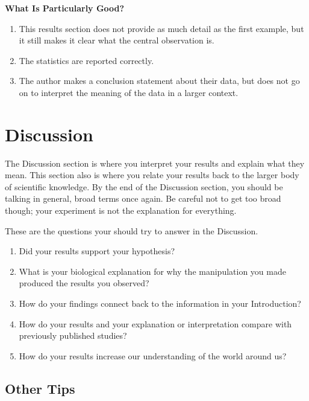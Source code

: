 \documentclass[
]{book}
\providecommand{\tightlist}{%
  \setlength{\itemsep}{0pt}\setlength{\parskip}{0pt}}
\begin{document}
\textbf{What Is Particularly Good?}

\begin{enumerate}
\def\labelenumi{\arabic{enumi}.}
\tightlist
\item
  This results section does not provide as much detail as the first example, but it still makes it clear what the central observation is.
\item
  The statistics are reported correctly.
\item
  The author makes a conclusion statement about their data, but does not go on to interpret the meaning of the data in a larger context.
\end{enumerate}

\hypertarget{discussion380}{%
\chapter{Discussion}\label{discussion380}}

The Discussion section is where you interpret your results and explain what they mean. This section also is where you relate your results back to the larger body of scientific knowledge. By the end of the Discussion section, you should be talking in general, broad terms once again. Be careful not to get too broad though; your experiment is not the explanation for everything.

These are the questions your should try to answer in the Discussion.

\begin{enumerate}
\def\labelenumi{\arabic{enumi}.}
\tightlist
\item
  Did your results support your hypothesis?
\item
  What is your biological explanation for why the manipulation you made produced the results you observed?
\item
  How do your findings connect back to the information in your Introduction?
\item
  How do your results and your explanation or interpretation compare with previously published studies?
\item
  How do your results increase our understanding of the world around us?
\end{enumerate}

\hypertarget{other-tips-2}{%
\section{Other Tips}\label{other-tips-2}}
\end{document}
